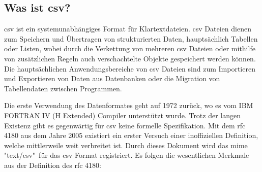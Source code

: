 \subsection{Was ist \acs{csv}?}
\acf{csv} ist ein systemunabhängiges Format für Klartextdateien. \acs{csv} Dateien dienen zum Speichern und Übertragen von strukturierten Daten, hauptsächlich Tabellen oder Listen, wobei durch die Verkettung von mehreren \acs{csv} Dateien oder mithilfe von zusätzlichen Regeln auch verschachtelte Objekte gespeichert werden können. Die hauptsächlichen Anwendungsbereiche von \acs{csv} Dateien sind zum Importieren und Exportieren von Daten aus Datenbanken oder die Migration von Tabellendaten zwischen Programmen. \cite{FuchsMediaSolutions:o.J.}

Die erste Verwendung des Datenformates geht auf 1972 zurück, wo es vom IBM FORTRAN IV (H Extended) Compiler \cite{IBM:1972} unterstützt wurde. Trotz der langen Existenz gibt es gegenwärtig für \acs{csv} keine formelle Spezifikation. Mit dem \acs{rfc} 4180 \cite{Shafranovich:2005} aus dem Jahre 2005 existiert ein erster Versuch einer inoffiziellen Definition, welche mittlerweile weit verbreitet ist. Durch dieses Dokument wird das \acf{mime} "text/csv"\ für das \acs{csv} Format registriert. Es folgen die wesentlichen Merkmale aus der Definition des \acs{rfc} 4180:

